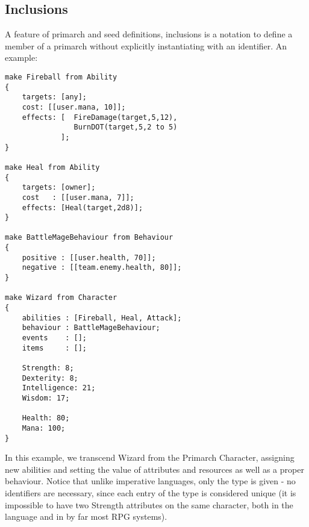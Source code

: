 \subsection{Inclusions}
A feature of primarch and seed definitions, inclusions  is a notation to define a member of a primarch without explicitly instantiating with an identifier. An example:
\begin{lstlisting}
make Fireball from Ability
{
	targets: [any];
	cost: [[user.mana, 10]];
	effects: [	FireDamage(target,5,12),
				BurnDOT(target,5,2 to 5)
			 ];
}

make Heal from Ability
{
	targets: [owner];
	cost   : [[user.mana, 7]];
	effects: [Heal(target,2d8)];
}

make BattleMageBehaviour from Behaviour
{
	positive : [[user.health, 70]];
	negative : [[team.enemy.health, 80]];
}

make Wizard from Character
{
	abilities : [Fireball, Heal, Attack];
	behaviour : BattleMageBehaviour;
	events    : [];
	items     : [];
                 
    Strength: 8;
    Dexterity: 8;
    Intelligence: 21;
    Wisdom: 17;
    
    Health: 80;
    Mana: 100;
}
\end{lstlisting}

In this example, we transcend Wizard from the Primarch Character, assigning new abilities and setting the value of attributes and resources as well as a proper behaviour. Notice that unlike imperative languages, only the type is given - no identifiers are necessary, since each entry of the type is considered unique (it is impossible to have two Strength attributes on the same character, both in the language and in by far most RPG systems).